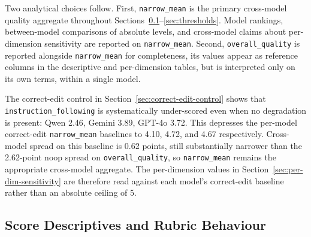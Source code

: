 Two analytical choices follow. First, \texttt{narrow\_mean} is the primary cross-model quality aggregate throughout Sections~\ref{sec:score-descriptives}--\ref{sec:thresholds}. Model rankings, between-model comparisons of absolute levels, and cross-model claims about per-dimension sensitivity are reported on \texttt{narrow\_mean}. Second, \texttt{overall\_quality} is reported alongside \texttt{narrow\_mean} for completeness, its values appear as reference columns in the descriptive and per-dimension tables, but is interpreted only on its own terms, within a single model.


The correct-edit control in Section~\ref{sec:correct-edit-control} shows that \texttt{instruction\_following} is systematically under-scored even when no degradation is present: Qwen 2.46, Gemini 3.89, GPT-4o 3.72. This depresses the per-model correct-edit \texttt{narrow\_mean} baselines to 4.10, 4.72, and 4.67 respectively. Cross-model spread on this baseline is 0.62 points, still substantially narrower than the 2.62-point noop spread on \texttt{overall\_quality}, so \texttt{narrow\_mean} remains the appropriate cross-model aggregate. The per-dimension values in Section~\ref{sec:per-dim-sensitivity} are therefore read against each model's correct-edit baseline rather than an absolute ceiling of 5.

\subsection{Score Descriptives and Rubric Behaviour} \label{sec:score-descriptives}

